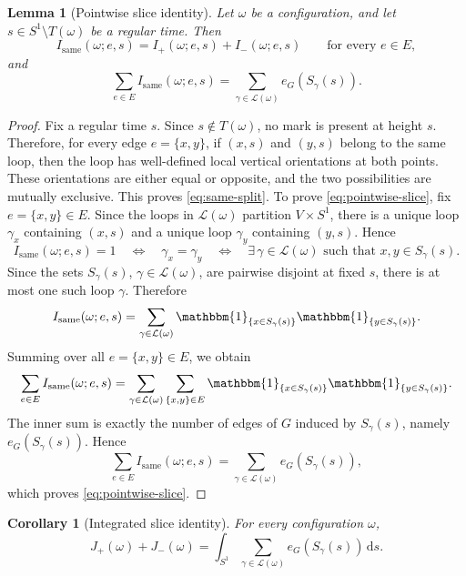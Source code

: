 \documentclass[11pt]{article}
\newtheorem{lemma}[theorem]{Lemma}
\newtheorem{corollary}[theorem]{Corollary}
\theoremstyle{remark}
\theoremstyle{plain}
\newcommand{\1}{\mathbbm{1}}
\newcommand{\dd}{\mathrm{d}}
\newcommand{\cL}{\mathcal{L}}
\begin{document}
\begin{lemma}[Pointwise slice identity]
\label{lem:pointwise-slice}
Let \(\omega\) be a configuration, and let \(s\in S^1\setminus T(\omega)\) be a regular time. Then
\begin{equation}
I_{\mathrm{same}}(\omega;e,s)=I_+(\omega;e,s)+I_-(\omega;e,s)
\qquad\text{for every }e\in E,
\label{eq:same-split}
\end{equation}
and
\begin{equation}
\sum_{e\in E} I_{\mathrm{same}}(\omega;e,s)
=
\sum_{\gamma\in\cL(\omega)} e_G(S_\gamma(s)).
\label{eq:pointwise-slice}
\end{equation}
\end{lemma}

\begin{proof}
Fix a regular time \(s\). Since \(s\notin T(\omega)\), no mark is present at height \(s\). Therefore, for every
edge \(e=\{x,y\}\), if \((x,s)\) and \((y,s)\) belong to the same loop, then the loop
has well-defined local vertical orientations at both points. These orientations are
either equal or opposite, and the two possibilities are mutually exclusive. This proves
\eqref{eq:same-split}.
To prove \eqref{eq:pointwise-slice}, fix \(e=\{x,y\}\in E\). Since the loops in
\(\cL(\omega)\) partition \(V\times S^1\), there is a unique loop \(\gamma_x\)
containing \((x,s)\) and a unique loop \(\gamma_y\) containing \((y,s)\). Hence
\[
I_{\mathrm{same}}(\omega;e,s)=1
\quad\Longleftrightarrow\quad
\gamma_x=\gamma_y
\quad\Longleftrightarrow\quad
\exists\,\gamma\in\cL(\omega)\text{ such that }x,y\in S_\gamma(s).
\]
Since the sets \(S_\gamma(s)\), \(\gamma\in\cL(\omega)\), are pairwise disjoint at
fixed \(s\), there is at most one such loop \(\gamma\). Therefore
\[
I_{\mathrm{same}}(\omega;e,s)
=
\sum_{\gamma\in\cL(\omega)}
\1_{\{x\in S_\gamma(s)\}}\1_{\{y\in S_\gamma(s)\}}.
\]
Summing over all \(e=\{x,y\}\in E\), we obtain
\[
\sum_{e\in E} I_{\mathrm{same}}(\omega;e,s)
=
\sum_{\gamma\in\cL(\omega)}
\sum_{\{x,y\}\in E}
\1_{\{x\in S_\gamma(s)\}}\1_{\{y\in S_\gamma(s)\}}.
\]
The inner sum is exactly the number of edges of \(G\) induced by \(S_\gamma(s)\),
namely \(e_G(S_\gamma(s))\). Hence
\[
\sum_{e\in E} I_{\mathrm{same}}(\omega;e,s)
=
\sum_{\gamma\in\cL(\omega)} e_G(S_\gamma(s)),
\]
which proves \eqref{eq:pointwise-slice}.
\end{proof}

\begin{corollary}[Integrated slice identity]
\label{cor:integrated-slice}
For every configuration \(\omega\),
\[
J_+(\omega)+J_-(\omega)
=
\int_{S^1}\sum_{\gamma\in\cL(\omega)} e_G(S_\gamma(s))\,\dd s.
\]
\end{corollary}
\end{document}
